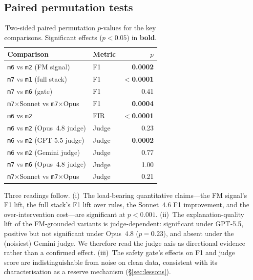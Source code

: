 \subsection{Paired permutation tests}
\label{app:stats-perm}

\begin{table}[!htbp]
\centering
\footnotesize
\setlength{\tabcolsep}{5pt}
\caption{Two-sided paired permutation $p$-values for the key
comparisons. Significant effects ($p<0.05$) in \textbf{bold}.}
\label{tab:stats_perm}
\begin{tabular}{@{}llr@{}}
\toprule
Comparison & Metric & $p$ \\
\midrule
\texttt{m6} vs \texttt{m2} (FM signal)        & F1   & \textbf{0.0002} \\
\texttt{m7} vs \texttt{m1} (full stack)       & F1   & \textbf{$<$0.0001} \\
\texttt{m7} vs \texttt{m6} (gate)             & F1   & 0.41 \\
\texttt{m7}$\times$Sonnet vs \texttt{m7}$\times$Opus & F1 & \textbf{0.0004} \\
\texttt{m6} vs \texttt{m2}                    & FIR  & \textbf{$<$0.0001} \\
\texttt{m6} vs \texttt{m2} (Opus~4.8 judge)   & Judge & 0.23 \\
\texttt{m6} vs \texttt{m2} (GPT-5.5 judge)    & Judge & \textbf{0.0002} \\
\texttt{m6} vs \texttt{m2} (Gemini judge)     & Judge & 0.77 \\
\texttt{m7} vs \texttt{m6} (Opus~4.8 judge)   & Judge & 1.00 \\
\texttt{m7}$\times$Sonnet vs \texttt{m7}$\times$Opus & Judge & 0.21 \\
\bottomrule
\end{tabular}
\end{table}

Three readings follow. (i)~The load-bearing quantitative claims---the
FM signal's F1 lift, the full stack's F1 lift over rules, the
Sonnet~4.6 F1 improvement, and the over-intervention cost---are
significant at $p\!<\!0.001$. (ii)~The explanation-quality lift of
the FM-grounded variants is judge-dependent: significant under
GPT-5.5, positive but not significant under Opus~4.8 ($p\!=\!0.23$),
and absent under the (noisiest) Gemini judge. We therefore read the
judge axis as directional evidence rather than a confirmed effect.
(iii)~The safety gate's effects on F1 and judge score are
indistinguishable from noise on clean data, consistent with its
characterisation as a reserve mechanism (\S\ref{sec:lessons}).

